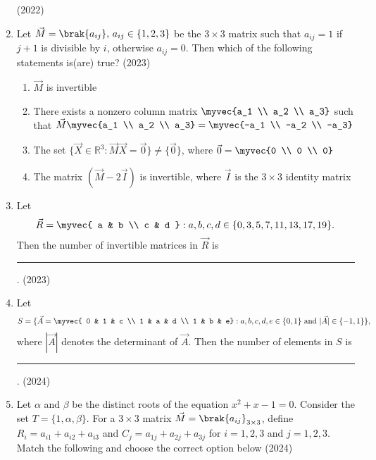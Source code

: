 \begin{enumerate}[label=\thesubsection.\arabic*.,ref=\thesubsection.\theenumi]
\hfill (2022)
\item Let $\vec{M} = \brak{ a_{ij} }, \, a_{ij} \in \{1,2,3\}$ be the $3 \times 3$ matrix such that $a_{ij} = 1$ if $j + 1$ is divisible by $i$, otherwise $a_{ij} = 0$. Then which of the following statements is(are) true?  
\hfill (2023)
\begin{enumerate}  
\item $\vec{M}$ is invertible  
\item There exists a nonzero column matrix $\myvec{a_1 \\ a_2 \\ a_3}$ such that $\vec{M} \myvec{a_1 \\ a_2 \\ a_3} = \myvec{-a_1 \\ -a_2 \\ -a_3}$  
\item The set $\{ \vec{X} \in \mathbb{R}^3 : \vec{M}\vec{X} = \vec{0} \} \neq \{\vec{0}\}$, where $\vec{0}= \myvec{0 \\ 0 \\ 0}$  
\item The matrix $(\vec{M} - 2\vec{I})$ is invertible, where $\vec{I}$ is the $3 \times 3$ identity matrix  
\end{enumerate}
\item Let $$\vec{R} =  \myvec{ a & b \\ c & d } : a, b, c, d \in \{0,3,5,7,11,13,17,19\}. $$
Then the number of invertible matrices in $\vec{R}$ is
\rule{1cm}{0.1pt}.
\hfill (2023)
%
\item Let $$S = \{ \vec{A} =  
	\myvec{  
    0 & 1 & c \\  
    1 & a & d \\  
    1 & b & e}
    : a, b, c, d, e \in \{0,1\} \text{ and } |\vec{A}| \in \{-1,1\}  
    \},$$  
    where $|\vec{A}|$ denotes the determinant of $\vec{A}$.  
    Then the number of elements in $S$ is 
    \rule{1cm}{0.1pt}.
\hfill (2024)
\item Let $\alpha$ and $\beta$ be the distinct roots of the equation $x^2 + x - 1 = 0$. Consider the set $T = \{1, \alpha, \beta\}$.
For a $3 \times 3$ matrix $\vec{M} = \brak{a_{ij}}_{3 \times 3}$, define $R_i = a_{i1} + a_{i2} + a_{i3}$ and $C_j = a_{1j} + a_{2j} + a_{3j}$ for $i = 1, 2, 3$ and $j = 1, 2, 3$.
Match the following
and choose the correct option below
    \hfill (2024)
\begin{table*}[!t]
\begin{multicols}{2}
\begin{enumerate}[label=\Alph*.]

\end{enumerate}
\end{multicols}
\end{table*}
\end{enumerate}
